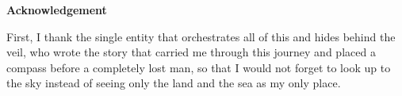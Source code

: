 %
%
%
%
%
%
\clearpage
{}
{}
\begin{center}
\textbf{\large Acknowledgement}\\[0.5cm]
\end{center}

\noindent First, I thank the single entity that orchestrates all of this and hides behind the veil, who wrote the story that carried me through this journey and placed a compass before a completely lost man, so that I would not forget to look up to the sky instead of seeing only the land and the sea as my only place.

